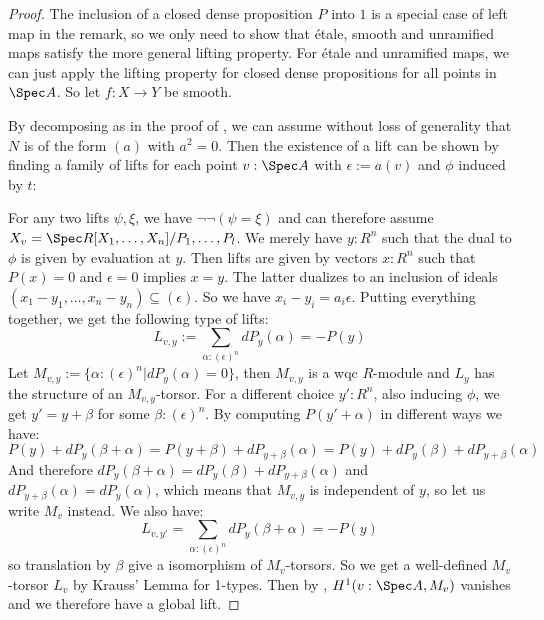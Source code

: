 \begin{proof}
  The inclusion of a closed dense proposition $P$ into $1$ is a special case of left map in the remark, so we only need to show that étale,
  smooth and unramified maps satisfy the more general lifting property. For étale and unramified maps, we can just apply the lifting property for closed dense propositions for all points in $\Spec A$. So let $f:X\to Y$ be smooth.
  
  By decomposing as in the proof of , we can assume without loss of generality that $N$ is of the form $(a)$ with $a^2=0$.
  Then the existence of a lift can be shown
  by finding a family of lifts for each point $v:\Spec A$ with $\epsilon:=a(v)$ and $\phi$ induced by $t$:
  \begin{center}
  \end{center}
  For any two lifts $\psi,\xi$, we have $\neg\neg(\psi=\xi)$
  and can therefore assume $X_v=\Spec R[X_1,\dots,X_n]/P_1,\dots,P_l$.
  We merely have $y:R^n$ such that the dual to $\phi$ is given by evaluation at $y$.
  Then lifts are given by vectors $x:R^n$ such that $P(x)=0$ and $\epsilon = 0$ implies $x=y$.
  The latter dualizes to an inclusion of ideals $(x_1-y_1,\dots,x_n-y_n)\subseteq (\epsilon)$.
  So we have $x_i-y_i=a_i\epsilon$.
  Putting everything together, we get the following type of lifts:
  \[L_{v,y}:=\sum_{\alpha:(\epsilon)^n}dP_y(\alpha)=-P(y) \]
  Let $M_{v,y}:=\{\alpha:(\epsilon)^n\vert dP_y(\alpha)=0\}$, then  $M_{v,y}$ is a wqc $R$-module and $L_y$ has the structure of an $M_{v,y}$-torsor.
  For a different choice $y':R^n$, also inducing $\phi$, we get $y'=y+\beta$ for some $\beta:(\epsilon)^n$.
  By computing $P(y'+\alpha)$ in different ways we have:
  \[P(y)+dP_y(\beta+\alpha)=P(y+\beta)+dP_{y+\beta}(\alpha)=P(y)+dP_y(\beta)+dP_{y+\beta}(\alpha)\]
  And therefore $dP_y(\beta+\alpha)=dP_y(\beta)+dP_{y+\beta}(\alpha)$ and $dP_{y+\beta}(\alpha)=dP_y(\alpha)$, which means that $M_{v,y}$ is independent of $y$, so let us write $M_v$ instead.
  We also have:
  \[L_{v,y'}=\sum_{\alpha:(\epsilon)^n}dP_y(\beta+\alpha)=-P(y)\]
  so translation by $\beta$ give a isomorphism of $M_{v}$-torsors.
  So we get a well-defined $M_v$-torsor $L_v$ by Krauss' Lemma for 1-types.
  Then by \cite{draft}, $H^1(v:\Spec A, M_v)$ vanishes and we therefore have a global lift. 
\end{proof}


